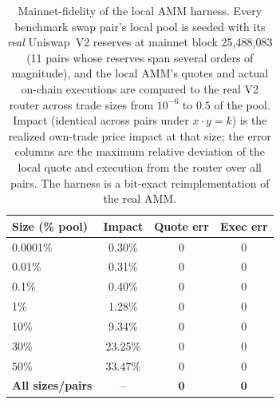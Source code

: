 \begin{table}[t]
\centering
\small
\setlength{\tabcolsep}{4pt}
\caption{Mainnet-fidelity of the local AMM harness. Every benchmark swap pair's local pool is seeded with its \emph{real} Uniswap~V2 reserves at mainnet block 25{,}488{,}083 (11 pairs whose reserves span several orders of magnitude), and the local AMM's quotes and actual on-chain executions are compared to the real V2 router across trade sizes from $10^{-6}$ to $0.5$ of the pool. Impact (identical across pairs under $x{\cdot}y{=}k$) is the realized own-trade price impact at that size; the error columns are the maximum relative deviation of the local quote and execution from the router over all pairs. The harness is a bit-exact reimplementation of the real AMM.}
\label{tab:fidelity}
\begin{tabular}{lccc}
\toprule
Size (\% pool) & Impact & Quote err & Exec err \\
\midrule
0.0001\% & 0.30\% & 0 & 0 \\
0.01\% & 0.31\% & 0 & 0 \\
0.1\% & 0.40\% & 0 & 0 \\
1\% & 1.28\% & 0 & 0 \\
10\% & 9.34\% & 0 & 0 \\
30\% & 23.25\% & 0 & 0 \\
50\% & 33.47\% & 0 & 0 \\
\midrule
\textbf{All sizes/pairs} & -- & $\mathbf{0}$ & $\mathbf{0}$ \\
\bottomrule
\end{tabular}
\end{table}
